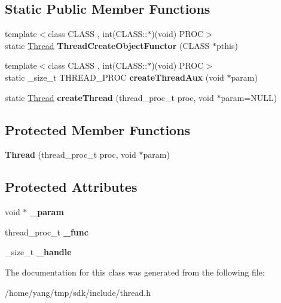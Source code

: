 \subsection*{Static Public Member Functions}
\begin{DoxyCompactItemize}
\item 
{\footnotesize template$<$class C\+L\+A\+SS , int(\+C\+L\+A\+S\+S\+::$\ast$)(void) P\+R\+OC$>$ }\\static \hyperlink{class_thread}{Thread} {\bfseries Thread\+Create\+Object\+Functor} (C\+L\+A\+SS $\ast$pthis)\hypertarget{class_thread_a3f90db7b5d45b275989c328ef070fb98}{}\label{class_thread_a3f90db7b5d45b275989c328ef070fb98}

\item 
{\footnotesize template$<$class C\+L\+A\+SS , int(\+C\+L\+A\+S\+S\+::$\ast$)(void) P\+R\+OC$>$ }\\static \+\_\+size\+\_\+t T\+H\+R\+E\+A\+D\+\_\+\+P\+R\+OC {\bfseries create\+Thread\+Aux} (void $\ast$param)\hypertarget{class_thread_ad54c62035ca2dcfc71c7e7181ce00454}{}\label{class_thread_ad54c62035ca2dcfc71c7e7181ce00454}

\item 
static \hyperlink{class_thread}{Thread} {\bfseries create\+Thread} (thread\+\_\+proc\+\_\+t proc, void $\ast$param=N\+U\+LL)\hypertarget{class_thread_a80157e1154d2a11085fc5a4fe9f9f1ea}{}\label{class_thread_a80157e1154d2a11085fc5a4fe9f9f1ea}

\end{DoxyCompactItemize}
\subsection*{Protected Member Functions}
\begin{DoxyCompactItemize}
\item 
{\bfseries Thread} (thread\+\_\+proc\+\_\+t proc, void $\ast$param)\hypertarget{class_thread_aa9198eddcbadc060866ec2eb2fae9ef6}{}\label{class_thread_aa9198eddcbadc060866ec2eb2fae9ef6}

\end{DoxyCompactItemize}
\subsection*{Protected Attributes}
\begin{DoxyCompactItemize}
\item 
void $\ast$ {\bfseries \+\_\+param}\hypertarget{class_thread_a59fd8af5b7f6acb58b0e0b40c4bfabdb}{}\label{class_thread_a59fd8af5b7f6acb58b0e0b40c4bfabdb}

\item 
thread\+\_\+proc\+\_\+t {\bfseries \+\_\+func}\hypertarget{class_thread_aa2d5e149d2dbab58296ba4c1da6b2b53}{}\label{class_thread_aa2d5e149d2dbab58296ba4c1da6b2b53}

\item 
\+\_\+size\+\_\+t {\bfseries \+\_\+handle}\hypertarget{class_thread_a1dace00cf3062a0525a479a8c0aea0ee}{}\label{class_thread_a1dace00cf3062a0525a479a8c0aea0ee}

\end{DoxyCompactItemize}


The documentation for this class was generated from the following file\+:\begin{DoxyCompactItemize}
\item 
/home/yang/tmp/sdk/include/thread.\+h\end{DoxyCompactItemize}
